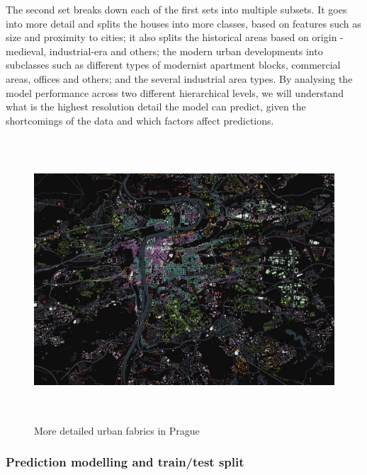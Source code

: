 \documentclass[
  letterpaper,
  DIV=11,
  numbers=noendperiod]{scrartcl}
\begin{document}
The second set breaks down each of the first sets into multiple subsets.
It goes into more detail and splits the houses into more classes, based
on features such as size and proximity to cities; it also splits the
historical areas based on origin - medieval, industrial-era and others;
the modern urban developments into subclasses such as different types of
modernist apartment blocks, commercial areas, offices and others; and
the several industrial area types. By analysing the model performance
across two different hierarchical levels, we will understand what is the
highest resolution detail the model can predict, given the shortcomings
of the data and which factors affect predictions.

\begin{figure}[H]

{\centering \includegraphics[width=\linewidth,height=4.16667in,keepaspectratio]{../figures/algo_design/prague_400.png}

}

\caption{More detailed urban fabrics in Prague}

\end{figure}%

\subsubsection{Prediction modelling and train/test
split}\label{prediction-modelling-and-traintest-split}
\end{document}
